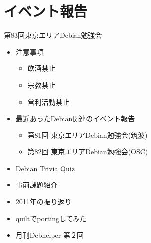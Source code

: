 \section{イベント報告}

\begin{frame}{第83回東京エリアDebian勉強会}
\begin{minipage}[t]{0.45\hsize}
  \begin{itemize}
  \item 注意事項
	\begin{itemize}
	 \item 飲酒禁止
	 \item 宗教禁止
	 \item 営利活動禁止
	\end{itemize}
   \item 最近あったDebian関連のイベント報告
	\begin{itemize}
        \item 第81回 東京エリアDebian勉強会(筑波)
        \item 第82回 東京エリアDebian勉強会(OSC)
	\end{itemize}
 \end{itemize}
\end{minipage} 
\begin{minipage}[t]{0.45\hsize}
 \begin{itemize}
   \item Debian Trivia Quiz
   \item 事前課題紹介
   \item 2011年の振り返り
   \item quiltでportingしてみた
   \item 月刊Debhelper 第２回
  \end{itemize}
\end{minipage}
\end{frame}

